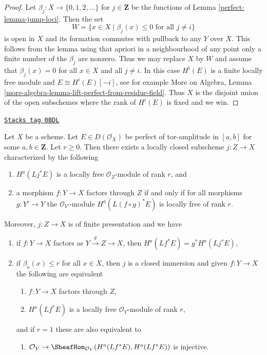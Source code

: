 \begin{proof}

Let $\beta_j : X \to \{0, 1, 2, \ldots\}$ for $j \in \mathbf{Z}$
be the functions of Lemma \ref{perfect-lemma-jump-loci}. Then the set
$$
W = \{x \in X \mid \beta_j(x) \leq 0\text{ for all }j \not = i\}
$$
is open in $X$ and its formation commutes with pullback to any
$Y$ over $X$. This follows from the lemma using that
apriori in a neighbourhood of any point only a finite number
of the $\beta_j$ are nonzero. Thus we may replace $X$ by $W$
and assume that $\beta_j(x) = 0$ for all $x \in X$ and all $j \not = i$.
In this case $H^i(E)$ is a finite locally free module and
$E \cong H^i(E)[-i]$, see for example
More on Algebra, Lemma
\ref{more-algebra-lemma-lift-perfect-from-residue-field}.
Thus $X$ is the disjoint union of the open subschemes where the
rank of $H^i(E)$ is fixed and we win.
\end{proof}

\begin{lemma}
\label{perfect-lemma-locally-closed-where-H0-locally-free}
\href{https://stacks.math.columbia.edu/tag/0BDL}{\texttt{Stacks tag 0BDL}}

Let $X$ be a scheme. Let $E \in D(\mathcal{O}_X)$ be perfect
of tor-amplitude in $[a, b]$ for some $a, b \in \mathbf{Z}$.
Let $r \geq 0$.
Then there exists a locally closed subscheme $j : Z \to X$
characterized by the following
\begin{enumerate}
\item $H^a(Lj^*E)$ is a locally free $\mathcal{O}_Z$-module of rank $r$, and
\item a morphism $f : Y \to X$ factors through $Z$
if and only if for all morphisms $g : Y' \to Y$ the
$\mathcal{O}_{Y'}$-module $H^a(L(f \circ g)^*E)$ is locally free
of rank $r$.
\end{enumerate}
Moreover, $j : Z \to X$ is of finite presentation and we have
\begin{enumerate}
\item[(3)] if $f : Y \to X$ factors as $Y \xrightarrow{g} Z \to X$, then
$H^a(Lf^*E) = g^*H^a(Lj^*E)$,
\item[(4)] if $\beta_a(x) \leq r$ for all $x \in X$, then
$j$ is a closed immersion and given $f : Y \to X$ the following
are equivalent
\begin{enumerate}
\item $f : Y \to X$ factors through $Z$,
\item $H^a(Lf^*E)$ is a locally free $\mathcal{O}_Y$-module of rank $r$,
\end{enumerate}
and if $r = 1$ these are also equivalent to
\begin{enumerate}
\item[(c)] $\mathcal{O}_Y \to \SheafHom_{\mathcal{O}_Y}(H^a(Lf^*E), H^a(Lf^*E))$
is injective.
\end{enumerate}
\end{enumerate}
\end{lemma}

